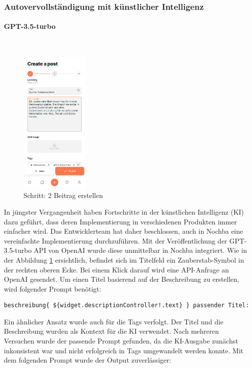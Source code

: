 \subsubsection{Autovervollständigung mit künstlicher Intelligenz}
\paragraph{GPT-3.5-turbo}\mbox{} \\


\begin{figure}[H]
  \centering
  \includegraphics[width=0.3\textwidth]{pics/create-post.png}
  \caption{Schritt: 2 Beitrag erstellen}
  \label{fig:createpost}
\end{figure}


In jüngster Vergangenheit haben Fortschritte in der künstlichen Intelligenz (KI) dazu geführt, dass deren Implementierung in verschiedenen Produkten immer einfacher wird. Das Entwicklerteam hat daher beschlossen, auch in Nochba eine vereinfachte Implementierung durchzuführen. Mit der Veröffentlichung der GPT-3.5-turbo API von OpenAI wurde diese unmittelbar in Nochba integriert. Wie in der Abbildung \ref{fig:createpost} ersichtlich, befindet sich im Titelfeld ein Zauberstab-Symbol in der rechten oberen Ecke. Bei einem Klick darauf wird eine API-Anfrage an OpenAI gesendet. Um einen Titel basierend auf der Beschreibung zu erstellen, wird folgender Prompt benötigt:
\begin{verbatim}
beschreibung{ ${widget.descriptionController!.text} } passender Titel:
\end{verbatim}



Ein ähnlicher Ansatz wurde auch für die Tags verfolgt. Der Titel und die Beschreibung wurden als Kontext für die KI verwendet. Nach mehreren Versuchen wurde der passende Prompt gefunden, da die KI-Ausgabe zunächst inkonsistent war und nicht erfolgreich in Tags umgewandelt werden konnte. Mit dem folgenden Prompt wurde der Output zuverlässiger:

